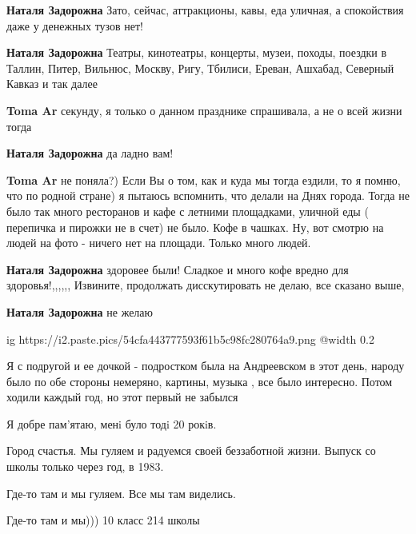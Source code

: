\begin{itemize}
\begin{itemize}
\textbf{Наталя Задорожна} Зато, сейчас, аттракционы, кавы, еда уличная, а спокойствия даже у денежных тузов нет!

\textbf{Наталя Задорожна} Театры, кинотеатры, концерты, музеи, походы, поездки в Таллин, Питер, Вильнюс, Москву, Ригу, Тбилиси, Ереван, Ашхабад, Северный Кавказ и так далее

\begin{itemize} %
\textbf{Toma Ar} секунду, я только о данном празднике спрашивала, а не о всей жизни тогда

\textbf{Наталя Задорожна} да ладно вам!

\textbf{Toma Ar} не поняла?) Если Вы о том, как и куда мы тогда ездили, то я помню, что по родной стране) я пытаюсь вспомнить, что делали на Днях города. Тогда не было так много ресторанов и кафе с летними площадками, уличной еды ( перепичка и пирожки не в счет) не было. Кофе в чашках. Ну, вот смотрю на людей на фото - ничего нет на площади. Только много людей.

\textbf{Наталя Задорожна} здоровее были! Сладкое и много кофе вредно для здоровья!,,,,,, Извините, продолжать дисскутировать не делаю, все сказано выше,

\textbf{Наталя Задорожна} не желаю
\end{itemize} %

\end{itemize} %


\ifcmt
  ig https://i2.paste.pics/54cfa443777593f61b5c98fc280764a9.png
  @width 0.2
\fi


Я с подругой и ее дочкой - подростком была на Андреевском в этот день, народу
было по обе стороны немеряно, картины, музыка , все было интересно. Потом
ходили каждый год, но этот первый не забылся


Я добре пам'ятаю, менi було тодi 20 рокiв.


Город счастья. Мы гуляем и радуемся своей беззаботной жизни. Выпуск со школы только через год, в 1983.

Где-то там и мы гуляем. Все мы там виделись.

Где-то там и мы))) 10 класс 214 школы


\end{itemize}
